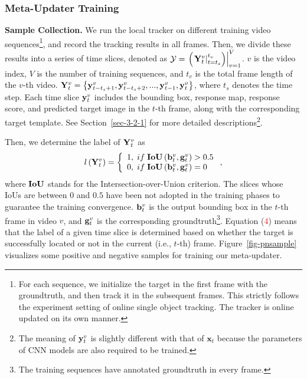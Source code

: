 \documentclass[10pt,twocolumn,letterpaper]{article}
\begin{document}
\subsubsection{Meta-Updater Training}
\vspace{-2mm}
\noindent \textbf{Sample Collection.} We run the local tracker on different training
video sequences\footnote{For each sequence, we initialize the target in the first frame
with the groundtruth, and then track it in the subsequent frames. This strictly follows
the experiment setting of online single object tracking. The tracker is online updated
on its own manner.}, and record the tracking results in all frames.
Then, we divide these results into a series of time slices, denoted as
$\mathcal{Y} = \left. {\left( {\left. {{\bf{Y}}_t^v} \right|_{t = {t_s}}^{{t_v}}}
\right)} \right|_{v = 1}^V$. $v$ is the video index, $V$ is the number of training
sequences, and ${{t_v}}$ is the total frame length of the $v$-th video.
${\bf{Y}}_t^v = \left\{ {{\bf{y}}_{t - {t_s} + 1}^v,{\bf{y}}_{t - {t_s} + 2}^v,...,
{\bf{y}}_{t - 1}^v,{\bf{y}}_t^v} \right\}$, where ${{t_s}}$ denotes the time step.
Each time slice ${{\bf{y}}_t^v}$ includes the bounding box, response map, response
score, and predicted target image in the $t$-th frame, along with the corresponding
target template.
See Section~\ref{sec-3-2-1} for more detailed descriptions\footnote{The meaning
of ${{\bf{y}}_t^v}$ is slightly different with that of $\mathbf{x}_t$ because the
parameters of CNN models are also required to be trained.}.

Then, we determine the label of ${{\bf{Y}}_t^v}$ as
 \vspace{-1mm}
\begin{equation}
 l\left( {{\bf{Y}}_t^v} \right) = \left\{ \begin{array}{l}
 1,\;if\;{\bf{IoU}}\left( {{\bf{b}}_t^v,{\bf{g}}_t^v} \right) > 0.5 \\
 0,\;if\;{\bf{IoU}}\left( {{\bf{b}}_t^v,{\bf{g}}_t^v} \right) = 0 \\
 \end{array} \right.,
 \label{eq:iou}
 \vspace{-1mm}
\end{equation}
where ${\bf{IoU}}$ stands for the Intersection-over-Union criterion.
The slices whose IoUs are between $0$ and $0.5$ have been not adopted in the training
phases to guarantee the training convergence.
${\bf{b}}_t^v$ is the output bounding box in the $t$-th frame in video $v$, and
${\bf{g}}_t^v$ is the corresponding groundtruth\footnote{The training sequences
have annotated groundtruth in every frame.}.
Equation (\textcolor{red}{4}) means that the label of a given time slice is determined based
on whether the target is successfully located or not in the current (i.e., $t$-th) frame.
Figure~\ref{fig-pnsample} visualizes some positive and negative samples
for training our meta-updater.
\end{document}

